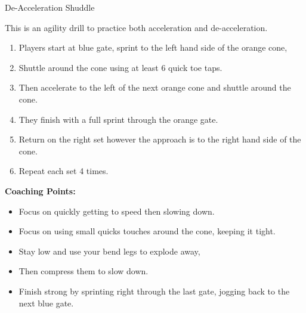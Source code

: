 \begin{oddBlock}{De-Acceleration Shuddle}
\begin{minipage}[t]{\linewidth}
\begin{minipage}{.7\linewidth}
        This is an agility drill to practice both acceleration and de-acceleration.
        \begin{enumerate}
        \setlength{\itemsep}{0pt}
        \setlength{\parskip}{0pt}
        \setlength{\parsep}{0pt}
        \item Players start at blue gate, sprint to the left hand side of the orange cone,
        \item Shuttle around the cone using at least 6 quick toe taps.
        \item Then accelerate to the left of the next orange cone and shuttle around the cone.
        \item They finish with a full sprint through the orange gate.
        \item Return on the right set however the approach is to the right hand side of the cone.
        \item Repeat each set 4 times.
        \end{enumerate}
    \end{minipage}
\end{minipage}
    \vspace{12pt}
    
    \textbf{Coaching Points:}
    \begin{itemize}
        \setlength{\itemsep}{0pt}
        \setlength{\parskip}{0pt}
        \setlength{\parsep}{0pt}
        \item Focus on quickly getting to speed then slowing down.
        \item Focus on using small quicks touches around the cone, keeping it tight.
        \item Stay low and use your bend legs to explode away,
        \item Then compress them to slow down.
        \item Finish strong by sprinting right through the last gate, jogging back to the next blue gate.
    \end{itemize}
\end{oddBlock}